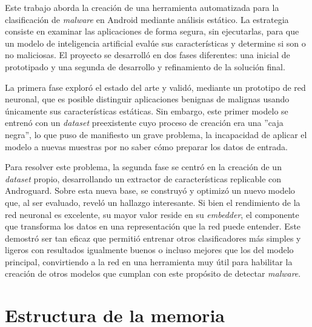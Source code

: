 





Este trabajo aborda la creación de una herramienta automatizada para la clasificación de \textit{malware} en Android mediante análisis estático. La estrategia consiste en examinar las aplicaciones de forma segura, sin ejecutarlas, para que un modelo de inteligencia artificial evalúe sus características y determine si son o no maliciosas. El proyecto se desarrolló en dos fases diferentes: una inicial de prototipado y una segunda de desarrollo y refinamiento de la solución final.

La primera fase exploró el estado del arte y validó, mediante un prototipo de red neuronal, que es posible distinguir aplicaciones benignas de malignas usando únicamente sus características estáticas. Sin embargo, este primer modelo se entrenó con un \textit{dataset} preexistente cuyo proceso de creación era una ''caja negra'', lo que puso de manifiesto un grave problema, la incapacidad de aplicar el modelo a nuevas muestras por no saber cómo preparar los datos de entrada.

Para resolver este problema, la segunda fase se centró en la creación de un \textit{dataset} propio, desarrollando un extractor de características replicable con Androguard. Sobre esta nueva base, se construyó y optimizó un nuevo modelo que, al ser evaluado, reveló un hallazgo interesante. Si bien el rendimiento de la red neuronal es excelente, su mayor valor reside en su \textit{embedder}, el componente que transforma los datos en una representación que la red puede entender. Este demostró ser tan eficaz que permitió entrenar otros clasificadores más simples y ligeros con resultados igualmente buenos o incluso mejores que los del modelo principal, convirtiendo a la red en una herramienta muy útil para habilitar la creación de otros modelos que cumplan con este propósito de detectar \textit{malware}.

\section{Estructura de la memoria}


